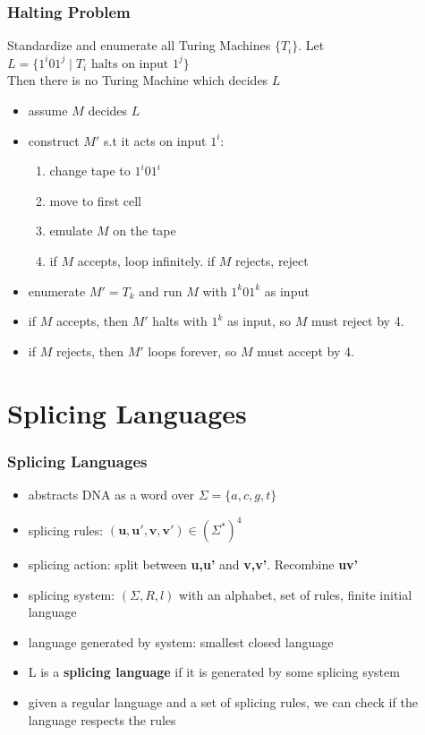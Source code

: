 \documentclass{beamer}
\begin{document}

\begin{frame}
\frametitle{Halting Problem}
\begin{theorem}
  Standardize and enumerate all Turing Machines $\{T_i\}$. Let $L = \{1^i01^j
  \mid T_i \text{ halts on input } 1^j\}$\\
  Then there is no Turing Machine which decides $L$
\end{theorem}
\begin{itemize}
\item assume $M$ decides $L$
\item construct $M'$ s.t it acts on input $1^i$:
  \begin{enumerate}
  \item change tape to $1^i01^i$
  \item move to first cell
  \item emulate $M$ on the tape
  \item if $M$ accepts, loop infinitely. if $M$ rejects, reject
  \end{enumerate}
\item enumerate $M' = T_k$ and run $M$ with $1^k01^k$ as input 
\item if $M$ accepts, then $M'$ halts with $1^k$ as input, so $M$ must reject by 4.
\item if $M$ rejects, then $M'$ loops forever, so $M$ must accept by 4.
\end{itemize}
\end{frame}


\section{Splicing Languages}
\begin{frame}
\frametitle{Splicing Languages}
\begin{itemize}
  \item abstracts DNA as a word over $\Sigma = \{a, c, g, t\}$
  \item splicing rules: $(\mathbf{u, u', v, v'}) \in (\Sigma^*)^4$
  \item splicing action: split between \textbf{u,u'} and \textbf{v,v'}.
    Recombine \textbf{uv'}
  \item splicing system: $(\Sigma, R, l)$ with an alphabet, set of rules,
    finite initial language
  \item language generated by system: smallest closed language
  \item L is a \textbf{splicing language} if it is generated by some splicing system
  \item given a regular language and a set of splicing rules, we can check if
    the language respects the rules
\end{itemize}
\end{frame}
\end{document}

